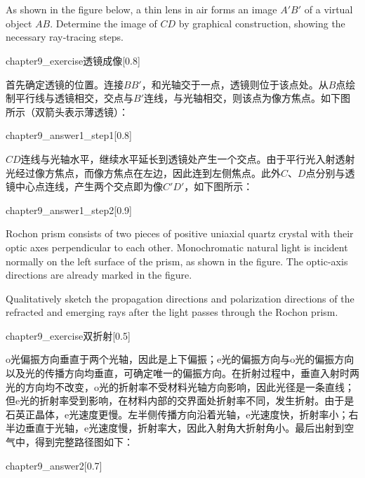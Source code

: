 \chapter[光学]{}
\begin{solution}
    As shown in the figure below, a thin lens in air forms an image $A'B'$ of a virtual object $AB$. Determine the image of $CD$ by graphical construction, showing the necessary ray‑tracing steps.
    \begin{singlefigure}{chapter9_exercise透镜成像}[0.8]
    \end{singlefigure}
    \vspace{-2em}
    \tcbrule

    首先确定透镜的位置。连接$BB'$，和光轴交于一点，透镜则位于该点处。从$B$点绘制平行线与透镜相交，交点与$B'$连线，与光轴相交，则该点为像方焦点。如下图所示（双箭头表示薄透镜）：
    \begin{singlefigure}{chapter9_answer1_step1}[0.8]
    \end{singlefigure}

    $CD$连线与光轴水平，继续水平延长到透镜处产生一个交点。由于平行光入射透射光经过像方焦点，而像方焦点在左边，因此连到左侧焦点。此外$C$、$D$点分别与透镜中心点连线，产生两个交点即为像$C'D'$，如下图所示：
    \begin{singlefigure}{chapter9_answer1_step2}[0.9]
    \end{singlefigure}
\end{solution}

\begin{solution}
    Rochon prism consists of two pieces of positive uniaxial quartz crystal with their optic axes perpendicular to each other. Monochromatic natural light is incident normally on the left surface of the prism, as shown in the figure. The optic-axis directions are already marked in the figure.

    Qualitatively sketch the propagation directions and polarization directions of the refracted and emerging rays after the light passes through the Rochon prism.
    \begin{singlefigure}{chapter9_exercise双折射}[0.5]
    \end{singlefigure}
    \tcbrule

    o光偏振方向垂直于两个光轴，因此是上下偏振；e光的偏振方向与o光的偏振方向以及光的传播方向均垂直，可确定唯一的偏振方向。在折射过程中，垂直入射时两光的方向均不改变，o光的折射率不受材料光轴方向影响，因此光径是一条直线；但e光的折射率受到影响，在材料内部的交界面处折射率不同，发生折射。由于是石英正晶体，e光速度更慢。左半侧传播方向沿着光轴，e光速度快，折射率小；右半边垂直于光轴，e光速度慢，折射率大，因此入射角大折射角小。最后出射到空气中，得到完整路径图如下：
    \begin{singlefigure}[answer2]{chapter9_answer2}[0.7]
    \end{singlefigure}
\end{solution}

